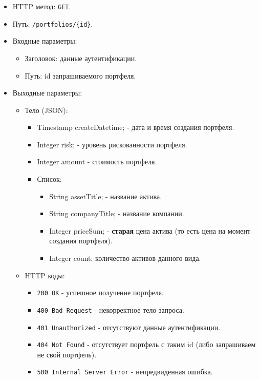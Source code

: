 \documentclass[a4paper, 14pt]{article}
\begin{document}
\begin{itemize}
    \item HTTP метод: \texttt{GET}.
    \item Путь: \texttt{/portfolios/\{id\}}.
    \item Входные параметры:
    \begin{itemize}
        \item Заголовок: данные аутентификации.
        \item Путь: id запрашиваемого портфеля.
    \end{itemize}
    \item Выходные параметры:
    \begin{itemize}
        \item Тело (JSON):
        \begin{itemize}
            \item Timestamp createDatetime; - дата и время создания портфеля.
            \item Integer risk; - уровень рискованности портфеля.
            \item Integer amount - стоимость портфеля.
            \item Список:
            \begin{itemize}
                \item String assetTitle; - название актива.
                \item String companyTitle; - название компании.
                \item Integer priceSum; - \textbf{старая} цена актива (то есть цена на момент создания портфеля).
                \item Integer count; количество активов данного вида.
            \end{itemize}
        \end{itemize}
        \item HTTP коды:
        \begin{itemize}
            \item \texttt{200 OK} - успешное получение портфеля.
            \item \texttt{400 Bad Request} - некорректное тело запроса.
            \item \texttt{401 Unauthorized} - отсутствуют данные аутентификации.
            \item \texttt{404 Not Found} - отсутствует портфель с таким id (либо запрашиваем не свой портфель).
            \item \texttt{500 Internal Server Error} - непредвиденная ошибка.
        \end{itemize}
    \end{itemize}
\end{itemize}
\end{document}
